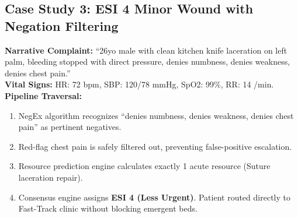 \documentclass[11pt,a4paper]{article}
\begin{document}
\subsection{Case Study 3: ESI 4 Minor Wound with Negation Filtering}
\textbf{Narrative Complaint:} ``26yo male with clean kitchen knife laceration on left palm, bleeding stopped with direct pressure, denies numbness, denies weakness, denies chest pain.''\\
\textbf{Vital Signs:} HR: 72 bpm, SBP: 120/78 mmHg, SpO2: 99\%, RR: 14 /min.\\
\textbf{Pipeline Traversal:}
\begin{enumerate}[leftmargin=1.5em]
    \item NegEx algorithm recognizes ``denies numbness, denies weakness, denies chest pain'' as pertinent negatives.
    \item Red-flag chest pain is safely filtered out, preventing false-positive escalation.
    \item Resource prediction engine calculates exactly 1 acute resource (Suture laceration repair).
    \item Consensus engine assigns \textbf{ESI 4 (Less Urgent)}. Patient routed directly to Fast-Track clinic without blocking emergent beds.
\end{enumerate}
\end{document}
